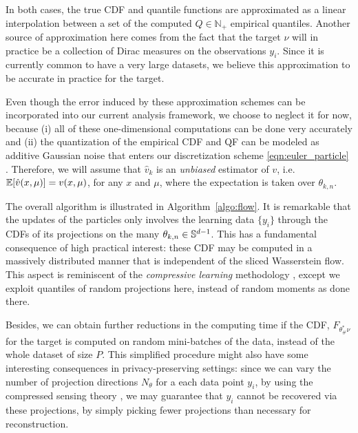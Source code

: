 In both cases, the true CDF and quantile functions are approximated as a linear interpolation between a set of the computed $Q\in\mathbb{N}_+$ empirical quantiles.
Another source of approximation here comes from the fact that the target $\nu$ will in practice be a collection of Dirac measures on the observations $y_i$. Since it is currently common to have a very large datasets, we believe this approximation to be accurate in practice for the target.

Even though the error induced by these approximation schemes can be incorporated into our current analysis framework, we choose to neglect it for now, because (i) all of these one-dimensional computations can be done very accurately and (ii) the quantization of the empirical CDF and QF can be modeled as additive Gaussian noise that enters our discretization scheme \eqref{eqn:euler_particle} \cite{van1998asymptotic}. Therefore, we will assume that $\hat{v}_k$ is an \emph{unbiased} estimator of $v$, i.e.\ $\mathbb{E}[\hat{v}(x,\mu)] = v(x,\mu)$, for any $x$ and $\mu$, where the expectation is taken over $\theta_{k,n}$.



The overall algorithm is illustrated in Algorithm~\ref{algo:flow}. It is remarkable that the updates of the particles only involves the learning data $\{y_i\}$ through the CDFs of its projections on the many $\theta_{k,n}\in\mathbb{S}^{d-1}$. This has a fundamental consequence of high practical interest: these CDF may be computed in a massively distributed manner that is independent of the sliced Wasserstein flow. This aspect is reminiscent of the \textit{compressive learning} methodology \cite{gribonval2017compressive}, except we exploit quantiles of random projections here, instead of random moments as done there.



Besides, we can obtain further reductions in the computing time if the CDF, $F_{\theta^*_\#\nu}$ for the target is computed on random mini-batches of the data, instead of the whole dataset of size $P$. This simplified procedure might also have some interesting consequences in privacy-preserving settings: since we can vary the number of projection directions $N_\theta$ for a each data point $y_i$, by using the compressed sensing theory \cite{donoho2009observed}, we may guarantee that $y_i$ cannot be recovered via these projections, by simply picking fewer projections than necessary for reconstruction.




